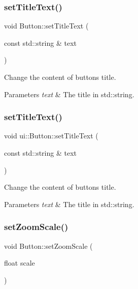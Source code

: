 \subsubsection{\texorpdfstring{set\+Title\+Text()}{setTitleText()}\hspace{0.1cm}{\footnotesize\ttfamily [1/2]}}
{\footnotesize\ttfamily void Button\+::set\+Title\+Text (\begin{DoxyParamCaption}\item[{const std\+::string \&}]{text }\end{DoxyParamCaption})}

Change the content of button\textquotesingle{}s title. 
\begin{DoxyParams}{Parameters}
{\em text} & The title in std\+::string. \\
\hline
\end{DoxyParams}
\mbox{\label{classui_1_1Button_a4d422eb851b5e4a8ce4fdf97edcb0a20}} 
\subsubsection{\texorpdfstring{set\+Title\+Text()}{setTitleText()}\hspace{0.1cm}{\footnotesize\ttfamily [2/2]}}
{\footnotesize\ttfamily void ui\+::\+Button\+::set\+Title\+Text (\begin{DoxyParamCaption}\item[{const std\+::string \&}]{text }\end{DoxyParamCaption})}

Change the content of button\textquotesingle{}s title. 
\begin{DoxyParams}{Parameters}
{\em text} & The title in std\+::string. \\
\hline
\end{DoxyParams}
\mbox{\label{classui_1_1Button_ad3216608c89b27bc1f4e8fde751122a2}} 
\subsubsection{\texorpdfstring{set\+Zoom\+Scale()}{setZoomScale()}\hspace{0.1cm}{\footnotesize\ttfamily [1/2]}}
{\footnotesize\ttfamily void Button\+::set\+Zoom\+Scale (\begin{DoxyParamCaption}\item[{float}]{scale }\end{DoxyParamCaption})}



